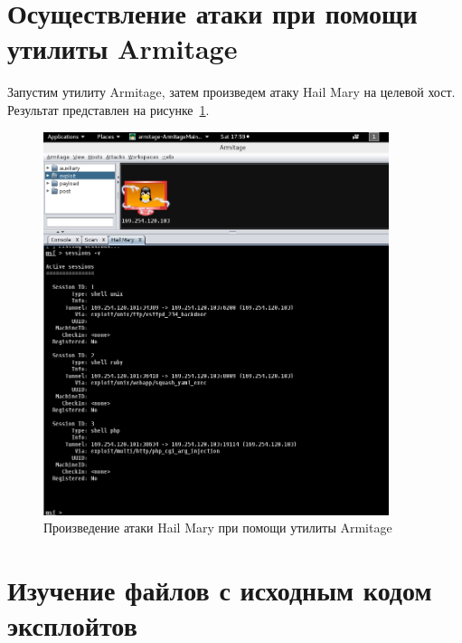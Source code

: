 \documentclass[10pt,a4paper]{report}
\begin{document}
	\section{Осуществление атаки при помощи утилиты Armitage}
		Запустим утилиту Armitage, затем произведем атаку Hail Mary на целевой хост.
		Результат представлен на рисунке~\ref{ris:armitage}.

		\begin{figure}[h]
			\centering
			\includegraphics[width=0.9\textwidth]{imgs/hm.png}
			\caption{Произведение атаки Hail Mary при помощи утилиты Armitage}
			\label{ris:armitage}
		\end{figure}
	\section{Изучение файлов с исходным кодом эксплойтов}
\end{document}
